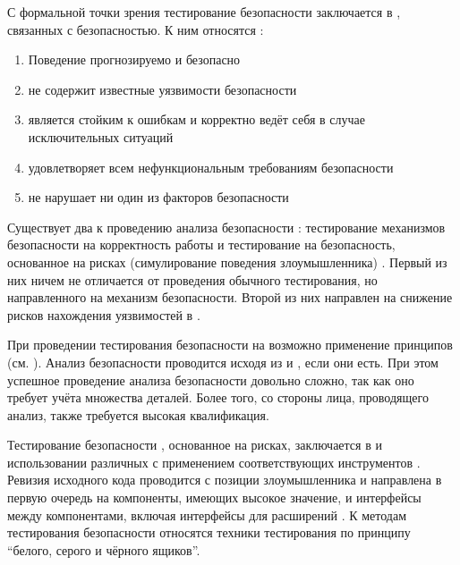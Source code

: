 %
С формальной точки зрения тестирование безопасности  заключается в , связанных с безопасностью. 
%
К ним относятся :
\begin{enumerate}
	\setlength{\itemsep}{0pt}%

	\item Поведение  прогнозируемо и безопасно
	
	\item {} не содержит известные уязвимости безопасности
	
	\item {} является стойким к ошибкам и корректно ведёт себя в случае исключительных ситуаций

	\item {} удовлетворяет всем нефункциональным требованиям безопасности

	\item {} не нарушает ни один из факторов безопасности
\end{enumerate}

%
Существует два  к проведению анализа безопасности : тестирование механизмов безопасности на корректность работы и тестирование  на безопасность, основанное на рисках (симулирование поведения злоумышленника) . 
%
Первый из них ничем не отличается от проведения обычного тестирования, но направленного на механизм безопасности. 
%
Второй из них направлен на снижение рисков нахождения уязвимостей в .

%
При проведении тестирования безопасности  на  возможно применение принципов  (см. ). 
%
Анализ безопасности проводится исходя из  и , если они есть. 
%
При этом успешное проведение анализа безопасности довольно сложно, так как оно требует учёта множества деталей. 
%
Более того, со стороны лица, проводящего анализ, также требуется высокая квалификация.

%
Тестирование безопасности , основанное на рисках, заключается в  и использовании различных  с применением соответствующих инструментов . 
%
Ревизия исходного кода проводится с позиции злоумышленника и направлена в первую очередь на компоненты, имеющих высокое значение, и интерфейсы между компонентами, включая интерфейсы для расширений . 
%
К методам тестирования безопасности относятся техники тестирования по принципу ``белого, серого и чёрного ящиков''.

